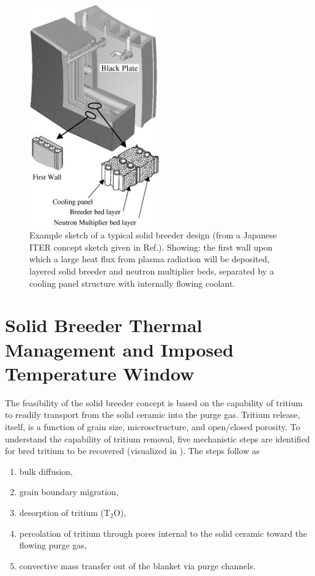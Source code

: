 \begin{figure}[ht]
	\centering
	\includegraphics[width=0.5\textwidth]{figures/japanese-tbm} 
	\caption{Example sketch of a typical solid breeder design (from a Japanese ITER concept sketch given in Ref.\cite{Nomoto2006}). Showing: the first wall upon which a large heat flux from plasma radiation will be deposited, layered solid breeder and neutron multiplier beds, separated by a cooling panel structure with internally flowing coolant.}
	\label{fig:solid-breeder-sketch}
\end{figure}

\FloatBarrier
\section{Solid Breeder Thermal Management and Imposed Temperature Window}

The feasibility of the solid breeder concept is based on the capability of tritium to readily transport from the solid ceramic into the purge gas. Tritium release, itself, is a function of grain size, microsctructure, and open/closed porosity. To understand the capability of tritium removal, five mechanistic steps are identified for bred tritium to be recovered (visualized in ). The steps follow as\cite{Clemmer1980}
\begin{enumerate}
\item bulk diffusion,
\item grain boundary migration,
\item desorption of tritium (T$_2$O),
\item percolation of tritium through pores internal to the solid ceramic toward the flowing purge gas,
\item convective mass transfer out of the blanket via purge channels.
\end{enumerate}

